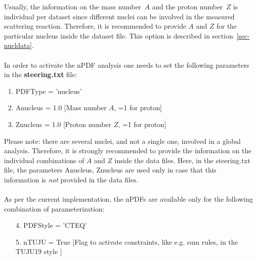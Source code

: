 \documentclass{article}
\begin{document}
Usually, the information on the mass number~$A$ and the proton number~$Z$ is individual per dataset since different nuclei can be involved in the measured scattering reaction. Therefore, it is recommended to provide $A$ and $Z$ for the particular nucleus inside the dataset file. This option is described in section~\ref{sec-nucldata}.\\ 
\\
In order to activate the nPDF analysis one needs to set the following parameters in the \textbf{steering.txt} file:
\begin{enumerate}
\item PDFType = 'nucleus'
\item Anucleus = 1.0 [Mass number $A$, =1 for proton]
\item Znucleus = 1.0 [Proton number $Z$, =1 for proton]
\end{enumerate}
\vskip 0.2in
\noindent Please note: there are several nuclei, and not a single one, involved in a global analysis. Therefore, it is strongly recommended to provide the information on the individual combinations of $A$ and $Z$ inside the data files. Here, in the steering.txt file, the parameters Anucleus, Znucleus are used only in case that this information is \textit{not} provided in the data files.\\
\\
As per the current implementation, the nPDFs are available only for the following combination of parameterization:
\begin{enumerate}
\item[4.] PDFStyle = 'CTEQ'
\item[5.] nTUJU = True [Flag to activate constraints, like e.g. sum rules, in the TUJU19 style \cite{Walt:2019slu}]
\end{enumerate}
\end{document}
